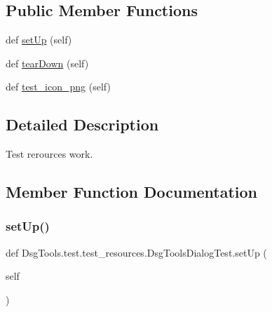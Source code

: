 \subsection*{Public Member Functions}
\begin{DoxyCompactItemize}
\item 
def \mbox{\hyperlink{class_dsg_tools_1_1test_1_1test__resources_1_1_dsg_tools_dialog_test_a6600fc942efe9c6598a65c8a47e975e3}{set\+Up}} (self)
\item 
def \mbox{\hyperlink{class_dsg_tools_1_1test_1_1test__resources_1_1_dsg_tools_dialog_test_a4feb8fa483be56bb6f9df1430df18c94}{tear\+Down}} (self)
\item 
def \mbox{\hyperlink{class_dsg_tools_1_1test_1_1test__resources_1_1_dsg_tools_dialog_test_ad25f2e26d52a8340842e60ece1d413a0}{test\+\_\+icon\+\_\+png}} (self)
\end{DoxyCompactItemize}


\subsection{Detailed Description}
\begin{DoxyVerb}Test rerources work.\end{DoxyVerb}
 

\subsection{Member Function Documentation}
\mbox{\label{class_dsg_tools_1_1test_1_1test__resources_1_1_dsg_tools_dialog_test_a6600fc942efe9c6598a65c8a47e975e3}} 
\subsubsection{\texorpdfstring{set\+Up()}{setUp()}}
{\footnotesize\ttfamily def Dsg\+Tools.\+test.\+test\+\_\+resources.\+Dsg\+Tools\+Dialog\+Test.\+set\+Up (\begin{DoxyParamCaption}\item[{}]{self }\end{DoxyParamCaption})}


